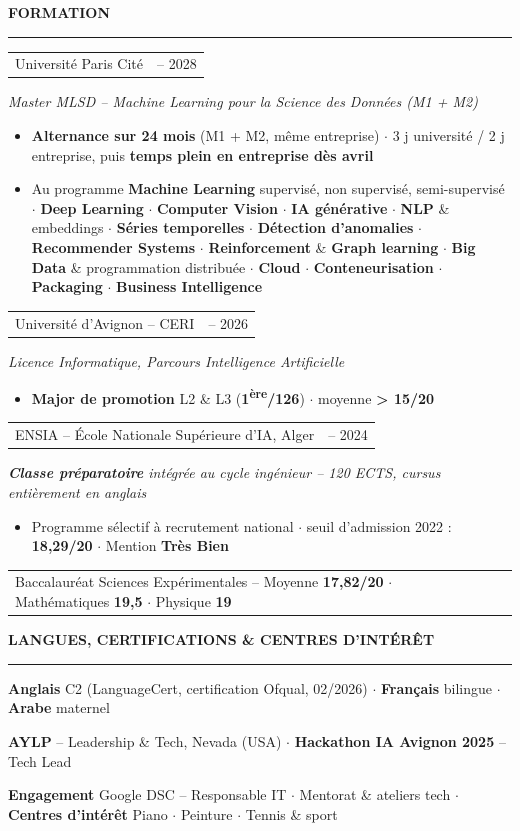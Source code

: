 \documentclass[10pt, a4paper]{article}
\makeatletter
\newcommand{\headfont}{\sffamily}
\newlength{\mainInner}\setlength{\mainInner}{\textwidth}
\providecommand{\cvFit}{1.0}
\newlength{\cvMainHeight}
\newlength{\cvMainAvail}
\newlength{\cvgap}
\newcommand{\vgap}[1]{\setlength{\cvgap}{#1}\vspace{\cvFit\cvgap}}
\newcommand{\mainSection}[1]{%
  \vgap{6pt}%
  {\headfont\color{sectionColor}\fontsize{10pt}{11.5pt}\selectfont\bfseries\MakeUppercase{#1}}\par%
  \nointerlineskip\vgap{2pt}%
  {\color{ruleColor}\rule{\mainInner}{0.8pt}}\par\vgap{4pt}%
}
\newcommand{\cvEntry}[4]{%
  \begin{tabularx}{\mainInner}{@{}X r@{}}
    {\headfont\fontsize{10pt}{11.5pt}\selectfont #1} &
    {\headfont\color{mutedText}\fontsize{8.5pt}{10pt}\selectfont #3}
  \end{tabularx}\par\vspace{1pt}%
  {\color{subtitleColor}\fontsize{9.5pt}{10pt}\selectfont\itshape #2}\par
  #4\vgap{6pt}%
}
\newcommand{\cvOneLine}[2]{%
  \begin{tabularx}{\mainInner}{@{}X r@{}}
    {\headfont\fontsize{10pt}{11.5pt}\selectfont #1} &
    {\headfont\color{mutedText}\fontsize{8.5pt}{10pt}\selectfont #2}
  \end{tabularx}\par\vgap{4pt}%
}
\newcommand{\cvBullets}[1]{%
  \vspace{2pt}%
  \begin{itemize}[leftmargin=10pt,itemsep=1pt,topsep=0pt,partopsep=0pt,parsep=0pt,
    label={\color{gold}\small$\bullet$}]
    #1
  \end{itemize}%
}
\newcommand{\cvItem}[1]{\item{\fontsize{8.8pt}{10.8pt}\selectfont #1}}
\makeatother
\begin{document}
\begin{lrbox}{\cvMainBox}
\begin{minipage}[t]{\mainInner}
  \mainSection{Formation}
  \cvEntry{Université Paris Cité}
    {Master MLSD -- Machine Learning pour la Science des Données (M1 + M2)}
    {2026 -- 2028}{%
    \cvBullets{
      \cvItem{\textbf{Alternance sur 24 mois} (M1 + M2, même entreprise) $\cdot$ 3 j université / 2 j entreprise, puis \textbf{temps plein en entreprise dès avril}}
      \cvItem{Au programme \textbf{Machine Learning} supervisé, non supervisé, semi-supervisé $\cdot$ \textbf{Deep Learning} $\cdot$ \textbf{Computer Vision} $\cdot$ \textbf{IA générative} $\cdot$ \textbf{NLP} \& embeddings $\cdot$ \textbf{Séries temporelles} $\cdot$ \textbf{Détection d'anomalies} $\cdot$ \textbf{Recommender Systems} $\cdot$ \textbf{Reinforcement} \& \textbf{Graph learning} $\cdot$ \textbf{Big Data} \& programmation distribuée $\cdot$ \textbf{Cloud} $\cdot$ \textbf{Conteneurisation} $\cdot$ \textbf{Packaging} $\cdot$ \textbf{Business Intelligence}}
    }
  }

  \cvEntry{Université d'Avignon -- CERI}
    {Licence Informatique, Parcours Intelligence Artificielle}
    {2024 -- 2026}{%
    \cvBullets{
      \cvItem{\textbf{Major de promotion} L2 \& L3 (\textbf{1\textsuperscript{ère}/126}) $\cdot$ moyenne \textbf{> 15/20}}
    }
  }

  \cvEntry{ENSIA -- École Nationale Supérieure d'IA, Alger}
    {\textbf{Classe préparatoire} intégrée au cycle ingénieur -- 120 ECTS, cursus entièrement en anglais}
    {2022 -- 2024}{%
    \cvBullets{
      \cvItem{Programme sélectif à recrutement national $\cdot$ seuil d'admission 2022 : \textbf{18,29/20} $\cdot$ Mention \textbf{Très Bien}}
    }
  }

  \cvOneLine{Baccalauréat Sciences Expérimentales {\normalfont\fontsize{9pt}{10pt}\selectfont
    -- Moyenne \textbf{17,82/20} $\cdot$ Mathématiques \textbf{19,5} $\cdot$ Physique \textbf{19}}}{2022}

  \mainSection{Langues, Certifications \& Centres d'intérêt}
  {\fontsize{9pt}{13pt}\selectfont
    \textbf{Anglais} C2 (LanguageCert, certification Ofqual, 02/2026) $\cdot$
    \textbf{Français} bilingue $\cdot$ \textbf{Arabe} maternel\par\vspace{3pt}
    \textbf{AYLP} -- Leadership \& Tech, Nevada (USA) $\cdot$
    \textbf{Hackathon IA Avignon 2025} -- Tech Lead\par\vspace{3pt}
    \textbf{Engagement} Google DSC -- Responsable IT $\cdot$ Mentorat \& ateliers tech $\cdot$
    \textbf{Centres d'intérêt} Piano $\cdot$ Peinture $\cdot$ Tennis \& sport\par
  }

\end{minipage}%
\end{lrbox}%
\setlength{\cvMainHeight}{\dimexpr\ht\cvMainBox+\dp\cvMainBox\relax}%
%
\usebox{\cvMainBox}%
\end{document}
